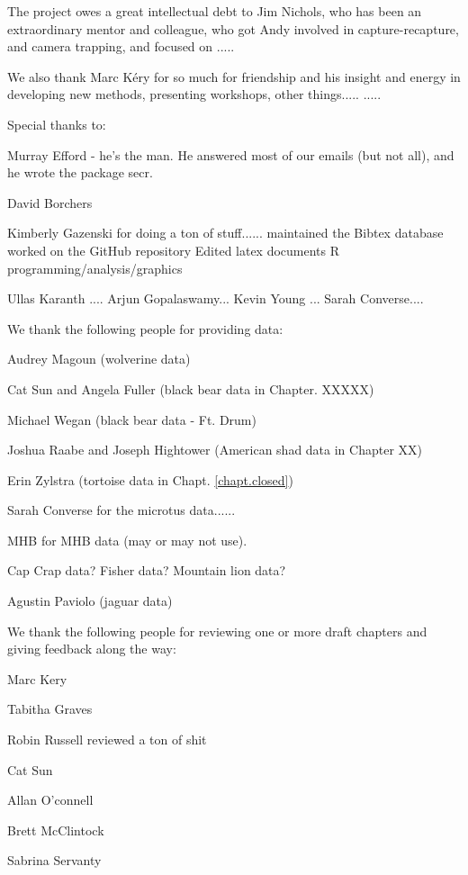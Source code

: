 The project owes a great intellectual debt to Jim Nichols, who has
been an extraordinary mentor and colleague, who
got Andy involved in capture-recapture, and camera trapping, and
focused on .....

We also thank Marc K\'{e}ry for so much for friendship and his insight
and energy in developing new methods, presenting workshops, other things.....
.....



Special thanks to:

Murray Efford - he's the man. He answered most of our emails (but not
all), and he wrote the package secr.

David Borchers

Kimberly Gazenski for doing a ton of stuff......
maintained the Bibtex database
worked on the GitHub repository
Edited latex documents
R programming/analysis/graphics

Ullas Karanth ....
Arjun Gopalaswamy...
Kevin Young ...
Sarah Converse....



We thank the following people for providing data:

Audrey Magoun (wolverine data)

Cat Sun and Angela Fuller (black bear data in Chapter. XXXXX)

Michael Wegan (black bear data - Ft. Drum)

Joshua Raabe and Joseph Hightower (American shad data in Chapter XX)

Erin Zylstra (tortoise data in Chapt. \ref{chapt.closed})

Sarah Converse for the microtus data......

MHB for MHB data (may or may not use).

Cap Crap data? Fisher data?  Mountain lion data?

Agustin Paviolo (jaguar data)


We thank the following people for reviewing one or more draft chapters
and giving feedback along the way:

Marc Kery

Tabitha Graves

Robin Russell reviewed a ton of shit

Cat Sun

Allan O'connell

Brett McClintock

Sabrina Servanty



